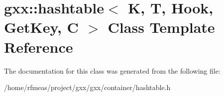 \hypertarget{classgxx_1_1hashtable}{}\section{gxx\+:\+:hashtable$<$ K, T, Hook, Get\+Key, C $>$ Class Template Reference}
\label{classgxx_1_1hashtable}


The documentation for this class was generated from the following file\+:\begin{DoxyCompactItemize}
\item 
/home/rfmeas/project/gxx/gxx/container/hashtable.\+h\end{DoxyCompactItemize}
